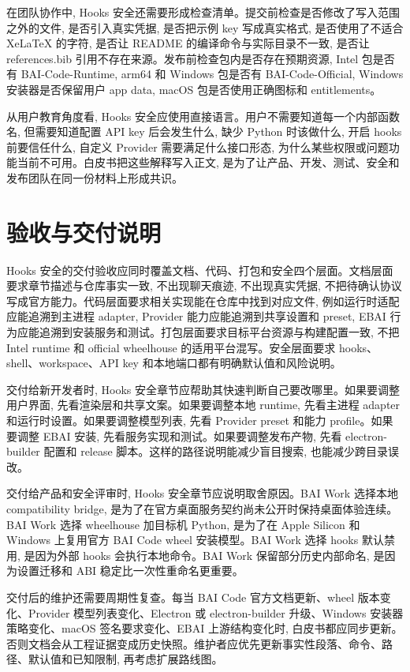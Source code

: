 在团队协作中, Hooks 安全还需要形成检查清单。提交前检查是否修改了写入范围之外的文件, 是否引入真实凭据, 是否把示例 key 写成真实格式, 是否使用了不适合 XeLaTeX 的字符, 是否让 README 的编译命令与实际目录不一致, 是否让 references.bib 引用不存在来源。发布前检查包内是否存在预期资源, Intel 包是否有 BAI-Code-Runtime, arm64 和 Windows 包是否有 BAI-Code-Official, Windows 安装器是否保留用户 app data, macOS 包是否使用正确图标和 entitlements。

从用户教育角度看, Hooks 安全应使用直接语言。用户不需要知道每一个内部函数名, 但需要知道配置 API key 后会发生什么, 缺少 Python 时该做什么, 开启 hooks 前要信任什么, 自定义 Provider 需要满足什么接口形态, 为什么某些权限或问题功能当前不可用。白皮书把这些解释写入正文, 是为了让产品、开发、测试、安全和发布团队在同一份材料上形成共识。

\section{验收与交付说明}
Hooks 安全的交付验收应同时覆盖文档、代码、打包和安全四个层面。文档层面要求章节描述与仓库事实一致, 不出现聊天痕迹, 不出现真实凭据, 不把待确认协议写成官方能力。代码层面要求相关实现能在仓库中找到对应文件, 例如运行时适配应能追溯到主进程 adapter, Provider 能力应能追溯到共享设置和 preset, EBAI 行为应能追溯到安装服务和测试。打包层面要求目标平台资源与构建配置一致, 不把 Intel runtime 和 official wheelhouse 的适用平台混写。安全层面要求 hooks、shell、workspace、API key 和本地端口都有明确默认值和风险说明。

交付给新开发者时, Hooks 安全章节应帮助其快速判断自己要改哪里。如果要调整用户界面, 先看渲染层和共享文案。如果要调整本地 runtime, 先看主进程 adapter 和运行时设置。如果要调整模型列表, 先看 Provider preset 和能力 profile。如果要调整 EBAI 安装, 先看服务实现和测试。如果要调整发布产物, 先看 electron-builder 配置和 release 脚本。这样的路径说明能减少盲目搜索, 也能减少跨目录误改。

交付给产品和安全评审时, Hooks 安全章节应说明取舍原因。BAI Work 选择本地 compatibility bridge, 是为了在官方桌面服务契约尚未公开时保持桌面体验连续。BAI Work 选择 wheelhouse 加目标机 Python, 是为了在 Apple Silicon 和 Windows 上复用官方 BAI Code wheel 安装模型。BAI Work 选择 hooks 默认禁用, 是因为外部 hooks 会执行本地命令。BAI Work 保留部分历史内部命名, 是因为设置迁移和 ABI 稳定比一次性重命名更重要。

交付后的维护还需要周期性复查。每当 BAI Code 官方文档更新、wheel 版本变化、Provider 模型列表变化、Electron 或 electron-builder 升级、Windows 安装器策略变化、macOS 签名要求变化、EBAI 上游结构变化时, 白皮书都应同步更新。否则文档会从工程证据变成历史快照。维护者应优先更新事实性段落、命令、路径、默认值和已知限制, 再考虑扩展路线图。

